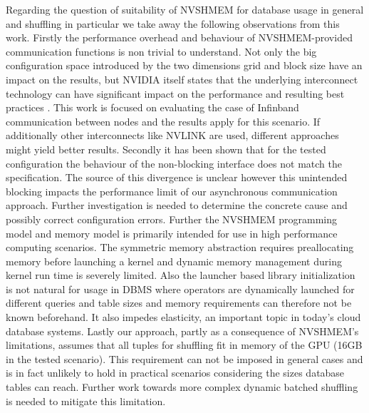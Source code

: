 Regarding the question of suitability of NVSHMEM for database usage in general and shuffling in particular we take away the following observations from this work. 
Firstly the performance overhead and behaviour of NVSHMEM-provided communication functions is non trivial to understand. Not only the big configuration space introduced by the two dimensions grid and block size have an impact on the results, but NVIDIA itself states that the underlying interconnect technology can have significant impact on the performance and resulting best practices \cite{NVIDIA2022}. This work is focused on evaluating the case of Infinband communication between nodes and the results apply for this scenario. If additionally other interconnects like NVLINK are used, different approaches might yield better results.
Secondly it has been shown that for the tested configuration the behaviour of the non-blocking interface does not match the specification. The source of this divergence is unclear however this unintended blocking impacts the performance limit of our asynchronous communication approach. Further investigation is needed to determine the concrete cause and possibly correct configuration errors.
Further the NVSHMEM programming model and memory model is primarily intended for use in high performance computing scenarios. The symmetric memory abstraction requires preallocating memory before launching a kernel and dynamic memory management during kernel run time is severely limited. Also the launcher based library initialization is not natural for usage in DBMS where operators are dynamically launched for different queries and table sizes and memory requirements can therefore not be known beforehand. It also impedes elasticity, an important topic in today's cloud database systems. 
Lastly our approach, partly as a consequence of NVSHMEM's limitations, assumes that all tuples for shuffling fit in memory of the GPU (16GB in the tested scenario). This requirement can not be imposed in general cases and is in fact unlikely to hold in practical scenarios considering the sizes database tables can reach. Further work towards more complex dynamic batched shuffling is needed to mitigate this limitation.
